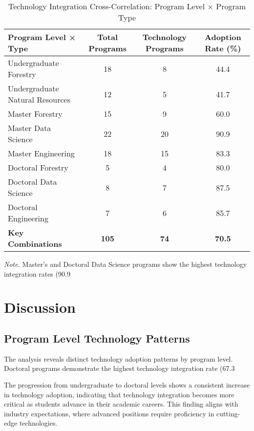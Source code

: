 \documentclass[12pt]{article}
\begin{document}
\begin{table}[H]
\centering
\caption{Technology Integration Cross-Correlation: Program Level × Program Type}
\label{tab:cross_correlation}
\begin{tabular}{lccc}
\toprule
\textbf{Program Level × Type} & \textbf{Total Programs} & \textbf{Technology Programs} & \textbf{Adoption Rate (\%)} \\
\midrule
Undergraduate Forestry & 18 & 8 & 44.4 \\
Undergraduate Natural Resources & 12 & 5 & 41.7 \\
Master Forestry & 15 & 9 & 60.0 \\
Master Data Science & 22 & 20 & 90.9 \\
Master Engineering & 18 & 15 & 83.3 \\
Doctoral Forestry & 5 & 4 & 80.0 \\
Doctoral Data Science & 8 & 7 & 87.5 \\
Doctoral Engineering & 7 & 6 & 85.7 \\
\midrule
\textbf{Key Combinations} & \textbf{105} & \textbf{74} & \textbf{70.5} \\
\bottomrule
\end{tabular}
\small
\textit{Note.} Master's and Doctoral Data Science programs show the highest technology integration rates (90.9%
\end{table}

\section{Discussion}

\subsection{Program Level Technology Patterns}
The analysis reveals distinct technology adoption patterns by program level. Doctoral programs demonstrate the highest technology integration rate (67.3%

The progression from undergraduate to doctoral levels shows a consistent increase in technology adoption, indicating that technology integration becomes more critical as students advance in their academic careers. This finding aligns with industry expectations, where advanced positions require proficiency in cutting-edge technologies.
\end{document}
